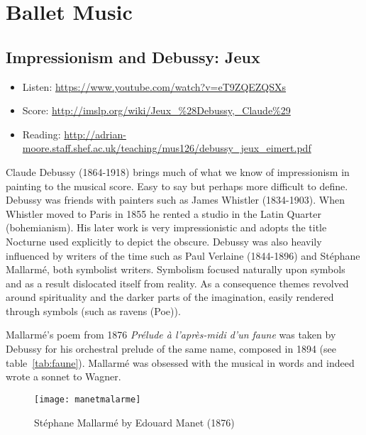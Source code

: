 
\chapter{Ballet Music}
\label{balletmusic}


\section{Impressionism and Debussy: Jeux}
\begin{itemize}
\item Listen: \url{https://www.youtube.com/watch?v=eT9ZQEZQSXs}
\item Score: \url{http://imslp.org/wiki/Jeux_%28Debussy,_Claude%29}
\item Reading: \url{http://adrian-moore.staff.shef.ac.uk/teaching/mus126/debussy_jeux_eimert.pdf}
\end{itemize}

Claude Debussy (1864-1918) brings much of what we know of impressionism in painting to the musical score. Easy to say but perhaps more difficult to define. Debussy was friends with painters such as James Whistler (1834-1903). When Whistler moved to Paris in 1855 he rented a studio in the Latin Quarter (bohemianism). His later work is very impressionistic and adopts the title Nocturne used explicitly to depict the obscure.      
Debussy was also heavily influenced by writers of the time such as Paul Verlaine (1844-1896) and St\'ephane Mallarm\'e, both symbolist writers. Symbolism focused naturally upon symbols and as a result dislocated itself from reality. As a consequence themes revolved around spirituality and the darker parts of the imagination, easily rendered through symbols (such as ravens (Poe)). 

Mallarm\'e's poem from 1876 \textit{Pr\'elude \`a l'apr\`es-midi d'un faune} was taken by Debussy for his orchestral prelude of the same name, composed in 1894 (see table~\ref{tab:faune}). Mallarm\'e was obsessed with the musical in words and indeed wrote a sonnet to Wagner. 

\begin{figure}[H]
\centering
\texttt{[image: manetmalarme]}\caption{St\'ephane Mallarm\'e by Edouard Manet (1876)}
\label{fig:quatierlatin}
\end{figure}

